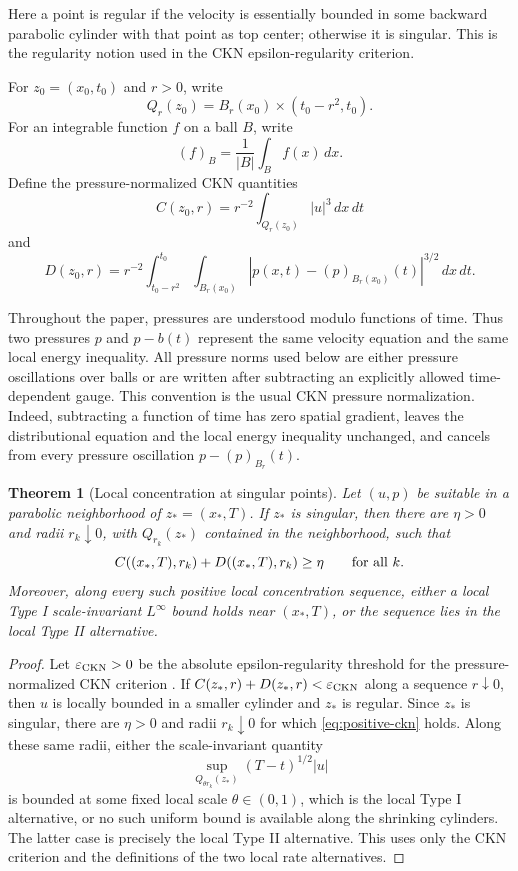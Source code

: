 \documentclass[11pt]{amsart}
\theoremstyle{plain}
\newtheorem{theorem}{Theorem}[section]
\theoremstyle{definition}
\theoremstyle{remark}
\numberwithin{equation}{section}
\begin{document}
Here a point is regular if the velocity is essentially bounded in some
backward parabolic cylinder with that point as top center; otherwise it is
singular.  This is the regularity notion used in the CKN epsilon-regularity
criterion.

For \(z_0=(x_0,t_0)\) and \(r>0\), write
\[
   Q_r(z_0)=B_r(x_0)\times(t_0-r^2,t_0).
\]
For an integrable function \(f\) on a ball \(B\), write
\[
   (f)_B=\frac1{|B|}\int_B f(x)\,dx .
\]
Define the pressure-normalized CKN quantities
\[
   C(z_0,r)=r^{-2}\int_{Q_r(z_0)}|u|^3\,dx\,dt
\]
and
\[
   D(z_0,r)=r^{-2}\int_{t_0-r^2}^{t_0}
      \int_{B_r(x_0)}
      |p(x,t)-(p)_{B_r(x_0)}(t)|^{3/2}\,dx\,dt.
\]

Throughout the paper, pressures are understood modulo functions of time.  Thus
two pressures \(p\) and \(p-b(t)\) represent the same velocity equation and the
same local energy inequality.  All pressure norms used below are either
pressure oscillations over balls or are written after subtracting an explicitly
allowed time-dependent gauge.  This convention is the usual CKN pressure
normalization.  Indeed, subtracting a function of time has zero spatial
gradient, leaves the distributional equation and the local energy inequality
unchanged, and cancels from every pressure oscillation
\(p-(p)_{B_r}(t)\).

\begin{theorem}[Local concentration at singular points]\label{thm:local-concentration}
Let \((u,p)\) be suitable in a parabolic neighborhood of
\(z_*=(x_*,T)\).  If \(z_*\) is singular, then there are \(\eta>0\) and
radii \(r_k\downarrow0\), with \(Q_{r_k}(z_*)\) contained in the neighborhood,
such that
\begin{equation}\label{eq:positive-ckn}
   C((x_*,T),r_k)+D((x_*,T),r_k)\ge\eta
   \qquad\hbox{for all }k.
\end{equation}
Moreover, along every such positive local concentration sequence, either a
local Type I scale-invariant \(L^\infty\) bound holds near \((x_*,T)\), or the
sequence lies in the local Type II alternative.
\end{theorem}

\begin{proof}
Let \(\varepsilon_{\rm CKN}>0\) be the absolute epsilon-regularity threshold
for the pressure-normalized CKN criterion \cite{CKN1982,Lin1998}.  If
\(C(z_*,r)+D(z_*,r)<\varepsilon_{\rm CKN}\) along a sequence
\(r\downarrow0\), then \(u\) is locally bounded in a smaller cylinder and
\(z_*\) is regular.  Since \(z_*\) is singular, there are
\(\eta>0\) and radii \(r_k\downarrow0\) for which
\eqref{eq:positive-ckn} holds.  Along these same radii, either the
scale-invariant quantity
\[
   \sup_{Q_{\theta r_k}(z_*)}(T-t)^{1/2}|u|
\]
is bounded at some fixed local scale \(\theta\in(0,1)\), which is the local
Type I alternative, or no such uniform bound is available along the shrinking
cylinders.  The latter case is precisely the local Type II alternative.  This
uses only the CKN criterion and the definitions of the two local rate
alternatives.
\end{proof}
\end{document}
